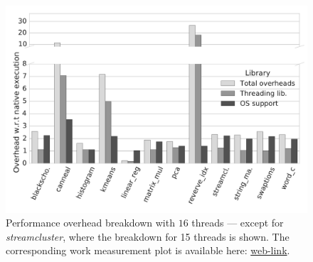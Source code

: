 
\begin{figure}[t]
\centering
\includegraphics[scale=0.25]{figure/benchmarks/times-16-threads.pdf}
\caption{Performance overhead breakdown with $16$ threads --- except for {\em streamcluster}, where the breakdown for 15 threads is shown. The corresponding work measurement plot is available here: \href{https://mic92.github.io/inspector/index.html\#graph4}{web-link}.}
\label{fig:overheads-breakdown}
\end{figure}
